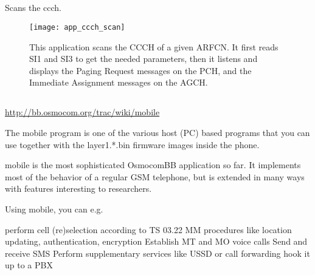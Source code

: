     \subsection{}

    \iffalse
    The ccch_scan application can sync to a carrier ARFCN and logs power
    measurement and CCCH information (paging requests and Immediate
    Assignments). 
    \fi

      Scans the ccch.

      \begin{figure}[h]
        \centering
        \texttt{[image: app\_ccch\_scan]}
        \caption{This application scans the CCCH of a given ARFCN. It
        first reads SI1 and SI3 to get the needed parameters, then it
      listens and displays the Paging Request messages on the PCH, and
    the Immediate Assignment messages on the AGCH.}
        \label{fig:app_ccch_scan}
      \end{figure}

    \subsection{}

    \iffalse
     mobile is the most sophisticated OsmocomBB application so far.

     It implements most of the behavior of a regular GSM telephone, but
     is extended in many ways with features interesting to researchers. 
     \fi

     \url{http://bb.osmocom.org/trac/wiki/mobile}


     \iffalse
      The mobile program is one of the various host (PC) based programs
      that you can use together with the layer1.*.bin firmware images
      inside the phone.

      mobile is the most sophisticated OsmocomBB application so far. It
      implements most of the behavior of a regular GSM telephone, but is
      extended in many ways with features interesting to researchers.

      Using mobile, you can e.g.

          perform cell (re)selection according to TS 03.22
              MM procedures like location updating, authentication,
              encryption
                  Establish MT and MO voice calls
                      Send and receive SMS
                          Perform supplementary services like USSD or
                          call forwarding
                              hook it up to a PBX 

